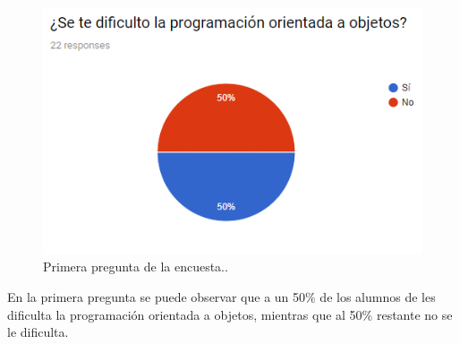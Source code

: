 \begin{figure}[H]
	\begin{center}
		\includegraphics[scale=0.6]{img/pregunta1.png} 
		\caption{Primera pregunta de la encuesta..}
		\label{p1}
	\end{center}
\end{figure}
En la primera pregunta se puede observar que a un 50\% de los alumnos de les dificulta la programación orientada a objetos, mientras que al 50\% restante no se le dificulta.

